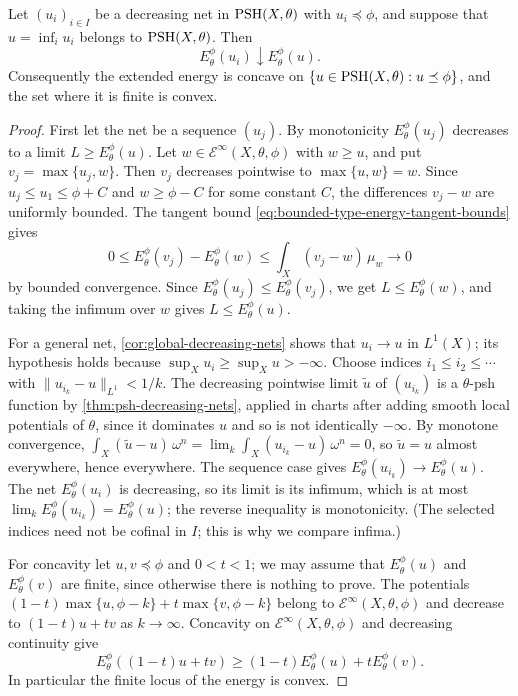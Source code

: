 \begin{proposition}\label{prop:relative-energy-decreasing-continuity}
Let $(u_i)_{i\in I}$ be a decreasing net in $\mathrm{PSH}(X,\theta)$ with $u_i\preceq\phi$, and suppose that $u=\inf_iu_i$ belongs to $\mathrm{PSH}(X,\theta)$. Then
\[
 E_\theta^\phi(u_i)\downarrow E_\theta^\phi(u).
\]
Consequently the extended energy is concave on $\{u\in\mathrm{PSH}(X,\theta):u\preceq\phi\}$, and the set where it is finite is convex.
\end{proposition}
\begin{proof}
First let the net be a sequence $(u_j)$. By monotonicity $E_\theta^\phi(u_j)$ decreases to a limit $L\geq E_\theta^\phi(u)$. Let $w\in\mathcal E^\infty(X,\theta,\phi)$ with $w\geq u$, and put $v_j=\max\{u_j,w\}$. Then $v_j$ decreases pointwise to $\max\{u,w\}=w$. Since $u_j\leq u_1\leq\phi+C$ and $w\geq\phi-C$ for some constant $C$, the differences $v_j-w$ are uniformly bounded. The tangent bound \eqref{eq:bounded-type-energy-tangent-bounds} gives
\[
 0\leq E_\theta^\phi(v_j)-E_\theta^\phi(w)
                         \leq\int_X(v_j-w)\,\mu_w\longrightarrow0
\]
by bounded convergence. Since $E_\theta^\phi(u_j)\leq E_\theta^\phi(v_j)$, we get $L\leq E_\theta^\phi(w)$, and taking the infimum over $w$ gives $L\leq E_\theta^\phi(u)$.

For a general net, \cref{cor:global-decreasing-nets} shows that $u_i\to u$ in $L^1(X)$; its hypothesis holds because $\sup_Xu_i\geq\sup_Xu>-\infty$. Choose indices $i_1\leq i_2\leq\cdots$ with $\|u_{i_k}-u\|_{L^1}<1/k$. The decreasing pointwise limit $\tilde u$ of $(u_{i_k})$ is a $\theta$-psh function by \cref{thm:psh-decreasing-nets}, applied in charts after adding smooth local potentials of $\theta$, since it dominates $u$ and so is not identically $-\infty$. By monotone convergence, $\int_X(\tilde u-u)\,\omega^n=\lim_k\int_X(u_{i_k}-u)\,\omega^n=0$, so $\tilde u=u$ almost everywhere, hence everywhere. The sequence case gives $E_\theta^\phi(u_{i_k})\to E_\theta^\phi(u)$. The net $E_\theta^\phi(u_i)$ is decreasing, so its limit is its infimum, which is at most $\lim_kE_\theta^\phi(u_{i_k})=E_\theta^\phi(u)$; the reverse inequality is monotonicity. (The selected indices need not be cofinal in $I$; this is why we compare infima.)

For concavity let $u,v\preceq\phi$ and $0<t<1$; we may assume that $E_\theta^\phi(u)$ and $E_\theta^\phi(v)$ are finite, since otherwise there is nothing to prove. The potentials $(1-t)\max\{u,\phi-k\}+t\max\{v,\phi-k\}$ belong to $\mathcal E^\infty(X,\theta,\phi)$ and decrease to $(1-t)u+tv$ as $k\to\infty$. Concavity on $\mathcal E^\infty(X,\theta,\phi)$ and decreasing continuity give
\[
 E_\theta^\phi((1-t)u+tv)
                    \geq(1-t)E_\theta^\phi(u)+tE_\theta^\phi(v).
\]
In particular the finite locus of the energy is convex.
\end{proof}

